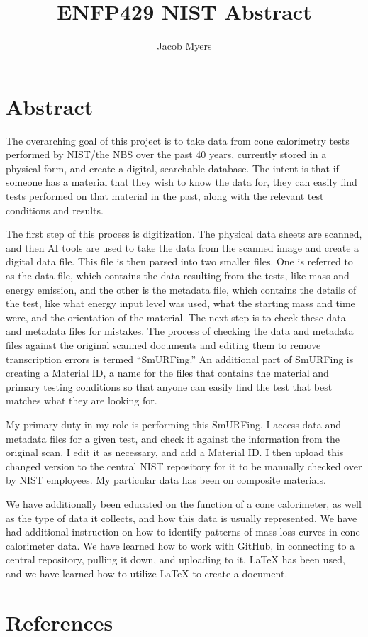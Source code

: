 \documentclass{abstract}
\title{ENFP429 NIST Abstract}
\author{Jacob Myers}
\begin{document}
\maketitle
\section{Abstract}
 The overarching goal of this project is to take data from cone calorimetry tests performed by NIST/the NBS over the past 40 years, currently stored in a physical form, and create a digital, searchable database. The intent is that if someone has a material that they wish to know the data for, they can easily find tests performed on that material in the past, along with the relevant test conditions and results.

 The first step of this process is digitization. The physical data sheets are scanned, and then AI tools are used to take the data from the scanned image and create a digital data file. This file is then parsed into two smaller files. One is referred to as the data file, which contains the data resulting from the tests, like mass and energy emission, and the other is the metadata file, which contains the details of the test, like what energy input level was used, what the starting mass and time were, and the orientation of the material. The next step is to check these data and metadata files for mistakes. The process of checking the data and metadata files against the original scanned documents and editing them to remove transcription errors is termed “SmURFing.” An additional part of SmURFing is creating a Material ID, a name for the files that contains the material and primary testing conditions so that anyone can easily find the test that best matches what they are looking for.
 
 My primary duty in my role is performing this SmURFing. I access data and metadata files for a given test, and check it against the information from the original scan. I edit it as necessary, and add a Material ID. I then upload this changed version to the central NIST repository for it to be manually checked over by NIST employees. My particular data has been on composite materials. 
 
 We have additionally been educated on the function of a cone calorimeter, as well as the type of data it collects, and how this data is usually represented. We have had additional instruction on how to identify patterns of mass loss curves in cone calorimeter data. We have learned how to work with GitHub, in connecting to a central repository, pulling it down, and uploading to it. LaTeX has been used, and we have learned how to utilize LaTeX to create a document. 
 

 \cite{babrauskas1982development, brown1988cone,emil1989flammability}


\section{References}
\printbibliography[heading=none]
\end{document}
